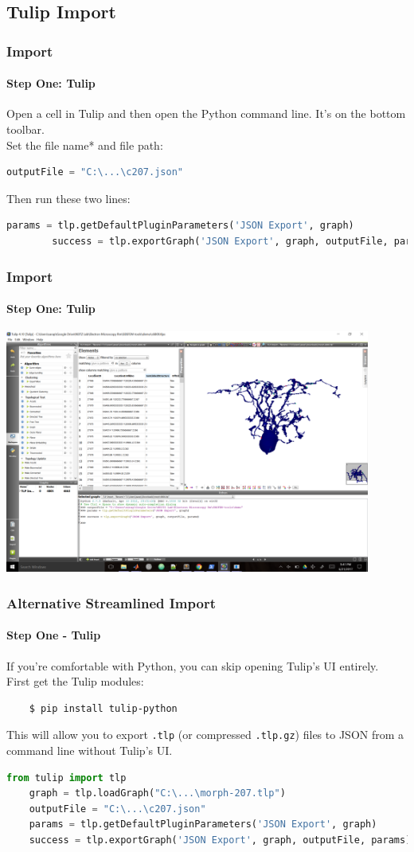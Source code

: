 \documentclass[11pt]{beamer}
\begin{document}
\subsection{Tulip Import}
\begin{frame}[fragile]
	\frametitle{Import}
	\framesubtitle{Step One: Tulip}
	\begin{block}{}
		Open a cell in Tulip and then open the Python command line. It's on the bottom toolbar.\\
		Set the file name* and file path:
		\begin{lstlisting}[language=python]
		outputFile = "C:\...\c207.json"\end{lstlisting}
		Then run these two lines:
		\begin{lstlisting}[language=python]
		params = tlp.getDefaultPluginParameters('JSON Export', graph)
		success = tlp.exportGraph('JSON Export', graph, outputFile, params)\end{lstlisting}
	\end{block}
\end{frame}
\begin{frame}
	\frametitle{Import}
	\framesubtitle{Step One: Tulip}
	\includegraphics[width = 0.9\textwidth]{tulip_python}
\end{frame}
\begin{frame}[fragile]
	\frametitle{Alternative Streamlined Import}
	\framesubtitle{Step One - Tulip}
	If you're comfortable with Python, you can skip opening Tulip's UI entirely.\\
	First get the Tulip modules:
	\begin{lstlisting}
	$ pip install tulip-python\end{lstlisting}
	This will allow you to export \texttt{.tlp} (or compressed \texttt{.tlp.gz}) files to JSON from a command line without Tulip's UI.
	\begin{lstlisting}[language=python]
	from tulip import tlp
	graph = tlp.loadGraph("C:\...\morph-207.tlp")
	outputFile = "C:\...\c207.json"
	params = tlp.getDefaultPluginParameters('JSON Export', graph)
	success = tlp.exportGraph('JSON Export', graph, outputFile, params)\end{lstlisting}
\end{frame}
\end{document}
